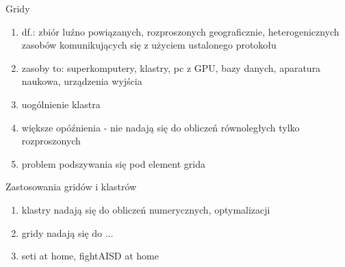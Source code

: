 \documentclass{beamer}
\begin{document}
\begin{frame}{Gridy}
  \begin{enumerate}
  \item df.: zbiór luźno powiązanych, rozproszonych geograficznie, heterogenicznych zasobów komunikujących się z użyciem ustalonego protokołu
  \item zasoby to: superkomputery, klastry, pc z GPU, bazy danych, aparatura naukowa, urządzenia wyjścia
  \item uogólnienie klastra
  \item większe opóźnienia - nie nadają się do obliczeń równoległych tylko rozproszonych
  \item problem podszywania się pod element grida
  \end{enumerate}
\end{frame}

\begin{frame}{Zastosowania gridów i klastrów}
  \begin{enumerate}
  \item klastry nadają się do obliczeń numerycznych, optymalizacji
  \item gridy nadają się do ...
  \item seti at home, fightAISD at home
  \end{enumerate}
\end{frame}
\end{document}
